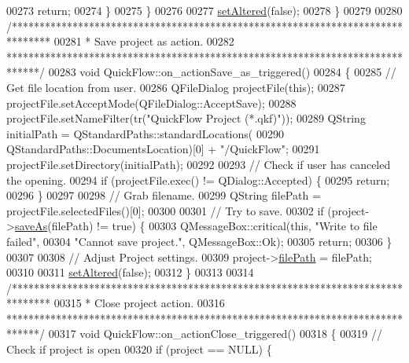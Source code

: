 \begin{DoxyCode}
00273       \textcolor{keywordflow}{return};
00274     \}
00275   \}
00276 
00277   \hyperlink{group___window_ga4b63ea5ca52a9eea14db0a22b5a133f8}{setAltered}(\textcolor{keyword}{false});
00278 \}
00279 
00280 \textcolor{comment}{/*******************************************************************************}
00281 \textcolor{comment}{ * Save project as action.}
00282 \textcolor{comment}{ ******************************************************************************/}
00283 \textcolor{keywordtype}{void} QuickFlow::on\_actionSave\_as\_triggered()
00284 \{
00285   \textcolor{comment}{// Get file location from user.}
00286   QFileDialog projectFile(\textcolor{keyword}{this});
00287   projectFile.setAcceptMode(QFileDialog::AcceptSave);
00288   projectFile.setNameFilter(tr(\textcolor{stringliteral}{"QuickFlow Project (*.qkf)"}));
00289   QString initialPath = QStandardPaths::standardLocations(
00290                           QStandardPaths::DocumentsLocation)[0] + \textcolor{stringliteral}{"/QuickFlow"};
00291   projectFile.setDirectory(initialPath);
00292 
00293   \textcolor{comment}{// Check if user has canceled the opening.}
00294   \textcolor{keywordflow}{if} (projectFile.exec() != QDialog::Accepted) \{
00295     \textcolor{keywordflow}{return};
00296   \}
00297 
00298   \textcolor{comment}{// Grab filename.}
00299   QString filePath = projectFile.selectedFiles()[0];
00300 
00301   \textcolor{comment}{// Try to save.}
00302   \textcolor{keywordflow}{if} (project->\hyperlink{class_project_ad32a31d548ad38f4cbbe0f95879a68e5}{saveAs}(filePath) != \textcolor{keyword}{true}) \{
00303     QMessageBox::critical(\textcolor{keyword}{this}, \textcolor{stringliteral}{"Write to file failed"},
00304                           \textcolor{stringliteral}{"Cannot save project."}, QMessageBox::Ok);
00305     \textcolor{keywordflow}{return};
00306   \}
00307 
00308   \textcolor{comment}{// Adjust Project settings.}
00309   project->\hyperlink{class_project_a79f30adcefd0b72bd4ac7db724bc9531}{filePath} = filePath;
00310 
00311   \hyperlink{group___window_ga4b63ea5ca52a9eea14db0a22b5a133f8}{setAltered}(\textcolor{keyword}{false});
00312 \}
00313 
00314 \textcolor{comment}{/*******************************************************************************}
00315 \textcolor{comment}{* Close project action.}
00316 \textcolor{comment}{******************************************************************************/}
00317 \textcolor{keywordtype}{void} QuickFlow::on\_actionClose\_triggered()
00318 \{
00319   \textcolor{comment}{// Check if project is open}
00320   \textcolor{keywordflow}{if} (project == NULL) \{

\end{DoxyCode}
